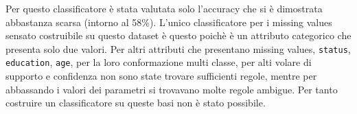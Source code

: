 Per questo classificatore \`e stata valutata solo l'accuracy che si \`e dimostrata
abbastanza scarsa (intorno al 58\%).
L'unico classificatore per i missing values sensato costruibile
su questo dataset \`e questo poich\`e \`e un attributo categorico che presenta solo
due valori. Per altri attributi che presentano missing values, \texttt{status},
\texttt{education}, \texttt{age}, per la loro conformazione multi classe, per alti
volare di supporto e confidenza non sono state trovare sufficienti regole, mentre
per abbassando i valori dei parametri si trovavano molte regole ambigue. Per tanto
costruire un classificatore su queste basi non \`e stato possibile.
